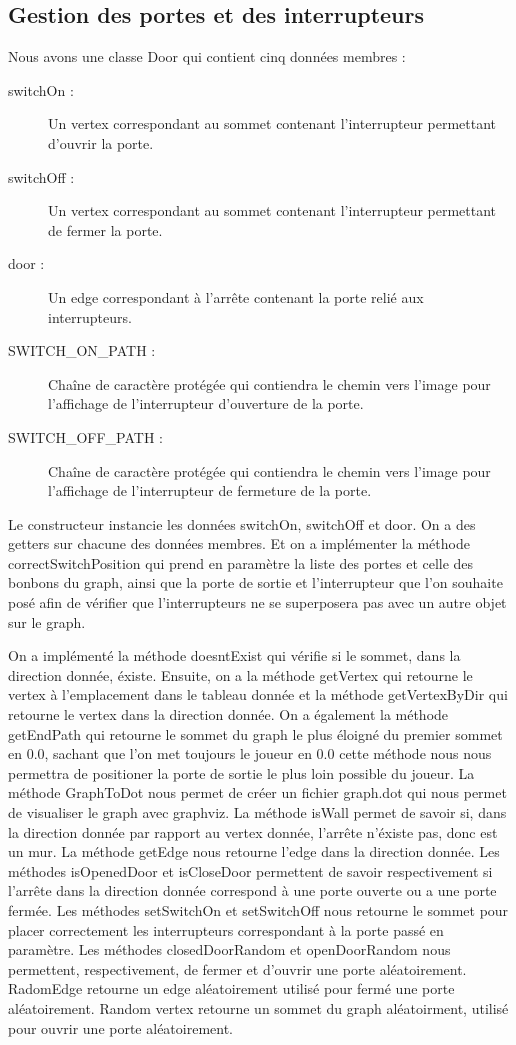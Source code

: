 \documentclass [10pt, a4paper]{article}
\begin{document}
\subsection {Gestion des portes et des interrupteurs}
Nous avons une classe Door qui contient cinq données membres :
\begin {description}
\item  [switchOn :]     Un vertex correspondant au sommet contenant l'interrupteur permettant d'ouvrir la porte.
\item  [switchOff :]     Un vertex correspondant au sommet contenant l'interrupteur permettant de fermer la porte.
\item  [door :] Un edge correspondant à l'arrête contenant la porte relié aux interrupteurs.
\item  [SWITCH\_ON\_PATH :] Chaîne de caractère protégée qui contiendra le chemin vers l'image pour l'affichage de l'interrupteur d'ouverture de la porte.
\item  [SWITCH\_OFF\_PATH :] Chaîne de caractère protégée qui contiendra le chemin vers l'image pour l'affichage de l'interrupteur de fermeture de la porte.
\end   {description}
Le constructeur instancie les données switchOn, switchOff et door. On a des getters sur chacune des données membres. Et on a implémenter la méthode correctSwitchPosition qui prend en paramètre la liste des portes et celle des bonbons du graph, ainsi que la porte de sortie et l'interrupteur que l'on souhaite posé afin de vérifier que l'interrupteurs ne se superposera pas avec un autre objet sur le graph.



On a implémenté la méthode doesntExist qui vérifie si le sommet, dans la direction donnée, éxiste. Ensuite, on a la méthode getVertex qui retourne le vertex à l'emplacement dans le tableau donnée et la méthode getVertexByDir qui retourne le vertex dans la direction donnée. On a également la méthode getEndPath qui retourne le sommet du graph le plus éloigné du premier sommet en 0.0, sachant que l'on met toujours le joueur en 0.0 cette méthode nous nous permettra de positioner la porte de sortie le plus loin possible du joueur. La méthode GraphToDot nous permet de créer un fichier graph.dot qui nous permet de visualiser le graph avec graphviz. La méthode isWall permet de savoir si, dans la direction donnée par rapport au vertex donnée, l'arrête n'éxiste pas, donc est un mur. La méthode getEdge nous retourne l'edge dans la direction donnée. Les méthodes isOpenedDoor et isCloseDoor permettent de savoir respectivement si l'arrête dans la direction donnée correspond à une porte ouverte ou a une porte fermée. Les méthodes setSwitchOn et setSwitchOff nous retourne le sommet pour placer correctement les interrupteurs correspondant à la porte passé en paramètre.
Les méthodes closedDoorRandom et openDoorRandom nous permettent, respectivement, de fermer et d'ouvrir une porte aléatoirement. RadomEdge retourne un edge aléatoirement utilisé pour fermé une porte aléatoirement. Random vertex retourne un sommet du graph aléatoirment, utilisé pour ouvrir une porte aléatoirement.
\end{document}
